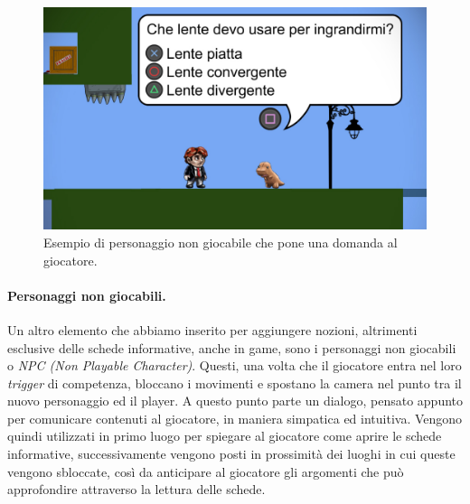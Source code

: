 \begin{figure}%
	\centering
	\includegraphics[width= 0.8\columnwidth]{images/gameDesign/53_NPC.jpg}
	\caption{Esempio di personaggio non giocabile che pone una domanda al giocatore.}
	\label{fig:serious_NPC}
\end{figure}

\paragraph{Personaggi non giocabili.}
\label{NPC}
Un altro elemento che abbiamo inserito per aggiungere nozioni, altrimenti esclusive delle schede informative, anche in game, sono i personaggi non giocabili o \textit{NPC (Non Playable Character)}.
Questi, una volta che il giocatore entra nel loro \textit{trigger} di competenza, bloccano i movimenti e spostano la camera nel punto tra il nuovo personaggio ed il player. A questo punto parte un dialogo, pensato appunto per comunicare contenuti al giocatore, in maniera simpatica ed intuitiva.
Vengono quindi utilizzati in primo luogo per spiegare al giocatore come aprire le schede informative, successivamente vengono posti in prossimità dei luoghi in cui queste vengono sbloccate, così da anticipare al giocatore gli argomenti che può approfondire attraverso la lettura delle schede.

